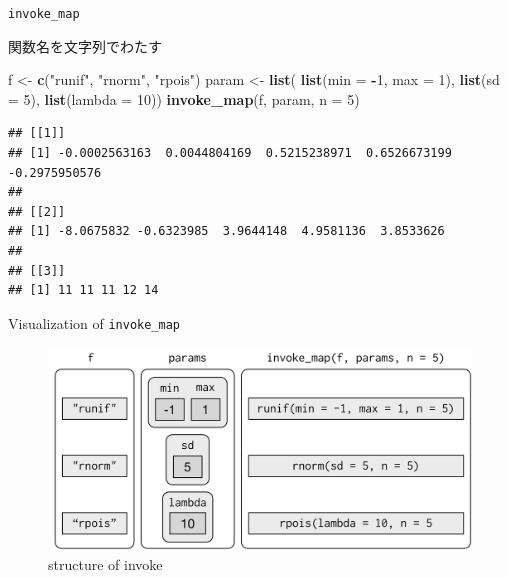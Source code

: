 \documentclass[ignorenonframetext,]{beamer}
\newenvironment{Shaded}{\begin{snugshade}}{\end{snugshade}}
\newcommand{\KeywordTok}[1]{\textcolor[rgb]{0.13,0.29,0.53}{\textbf{#1}}}
\newcommand{\DataTypeTok}[1]{\textcolor[rgb]{0.13,0.29,0.53}{#1}}
\newcommand{\DecValTok}[1]{\textcolor[rgb]{0.00,0.00,0.81}{#1}}
\newcommand{\StringTok}[1]{\textcolor[rgb]{0.31,0.60,0.02}{#1}}
\newcommand{\OperatorTok}[1]{\textcolor[rgb]{0.81,0.36,0.00}{\textbf{#1}}}
\newcommand{\NormalTok}[1]{#1}
\begin{document}
\begin{frame}[fragile]{\texttt{invoke\_map}}

関数名を文字列でわたす

\begin{Shaded}
\begin{Highlighting}[]
\NormalTok{f <-}\StringTok{ }\KeywordTok{c}\NormalTok{(}\StringTok{"runif"}\NormalTok{, }\StringTok{"rnorm"}\NormalTok{, }\StringTok{"rpois"}\NormalTok{)}
\NormalTok{param <-}\StringTok{ }\KeywordTok{list}\NormalTok{(}
          \KeywordTok{list}\NormalTok{(}\DataTypeTok{min =} \OperatorTok{-}\DecValTok{1}\NormalTok{, }\DataTypeTok{max =} \DecValTok{1}\NormalTok{), }
          \KeywordTok{list}\NormalTok{(}\DataTypeTok{sd =} \DecValTok{5}\NormalTok{), }
          \KeywordTok{list}\NormalTok{(}\DataTypeTok{lambda =} \DecValTok{10}\NormalTok{))}
\KeywordTok{invoke_map}\NormalTok{(f, param, }\DataTypeTok{n =} \DecValTok{5}\NormalTok{)}
\end{Highlighting}
\end{Shaded}

\begin{verbatim}
## [[1]]
## [1] -0.0002563163  0.0044804169  0.5215238971  0.6526673199 -0.2975950576
## 
## [[2]]
## [1] -8.0675832 -0.6323985  3.9644148  4.9581136  3.8533626
## 
## [[3]]
## [1] 11 11 11 12 14
\end{verbatim}

\end{frame}

\begin{frame}{Visualization of \texttt{invoke\_map}}

\begin{figure}
\centering
\includegraphics{../img/lists-invoke.png}
\caption{structure of invoke}
\end{figure}

\end{frame}
\end{document}
